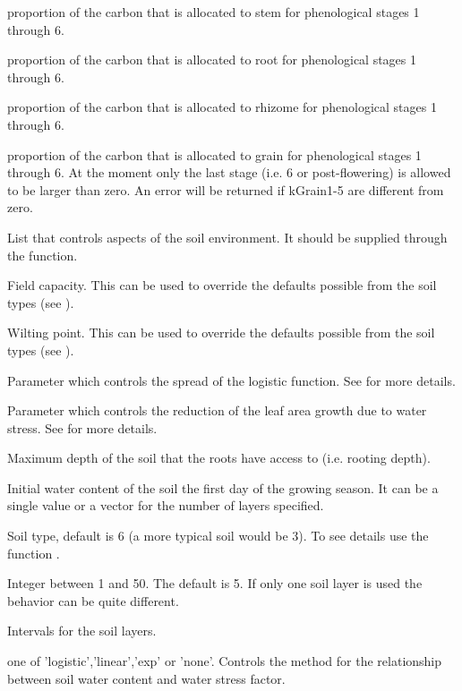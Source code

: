 \documentclass[letterpaper]{book}
\begin{document}
\begin{Arguments}
\begin{ldescription}
 proportion of the carbon that is
allocated to stem for phenological stages 1 through 6.

 proportion of the carbon that is
allocated to root for phenological stages 1 through 6.

 proportion of the carbon that is
allocated to rhizome for phenological stages 1 through 6.

 proportion of the carbon that is
allocated to grain for phenological stages 1 through 6.
At the moment only the last stage (i.e. 6 or
post-flowering) is allowed to be larger than zero. An
error will be returned if kGrain1-5 are different from
zero.

\item[\code{soilControl}] List that controls aspects of the soil
environment. It should be supplied through the
 function.

 Field capacity. This can be used to
override the defaults possible from the soil types (see
).

 Wilting point.  This can be used to override
the defaults possible from the soil types (see
).

 Parameter which controls the spread of the
logistic function. See  for more
details.

 Parameter which controls the reduction of the
leaf area growth due to water stress. See
 for more details.

 Maximum depth of the soil that the roots
have access to (i.e. rooting depth).

 Initial water content of the soil the
first day of the growing season. It can be a single value
or a vector for the number of layers specified.

 Soil type, default is 6 (a more typical
soil would be 3). To see details use the function
.

 Integer between 1 and 50. The default is
5. If only one soil layer is used the behavior can be
quite different.

 Intervals for the soil layers.

 one of 'logistic','linear','exp' or 'none'.
Controls the method for the relationship between soil
water content and water stress factor.


\end{ldescription}
\end{Arguments}
\end{document}
